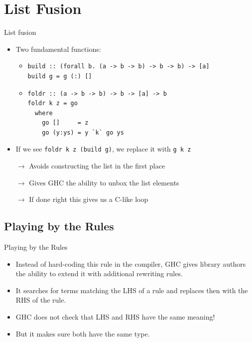 \documentclass[11pt]{beamer}
\begin{document}
\section{List Fusion}

\begin{frame}[fragile]{List fusion}
	\begin{itemize}
		\item Two fundamental functions:
			\begin{itemize}
				\item \begin{verbatim}
build :: (forall b. (a -> b -> b) -> b -> b) -> [a]
build g = g (:) []
\end{verbatim}
				\item \begin{verbatim}
foldr :: (a -> b -> b) -> b -> [a] -> b
foldr k z = go
  where
    go []     = z
    go (y:ys) = y `k` go ys
\end{verbatim}
			\end{itemize}
		\item If we see \texttt{foldr k z (build g)}, we replace it with \texttt{g k z}
		\item[$\rightarrow$] Avoids constructing the list in the first place
		\item[$\rightarrow$] Gives GHC the ability to unbox the list elements
		\item[$\rightarrow$] If done right this gives us a C-like loop
	\end{itemize}
\end{frame}

\subsection{Playing by the Rules}

\begin{frame}[fragile]{Playing by the Rules}
	\begin{itemize}
		\item Instead of hard-coding this rule in the compiler,
			  GHC gives library authors the ability to extend it with
			  additional rewriting rules.
		\item It searches for terms matching the LHS of a rule and
			  replaces then with the RHS of the rule.
		\item GHC does not check that LHS and RHS have the same meaning!
		\item But it makes sure both have the same type.
	\end{itemize}
\end{frame}
\end{document}
